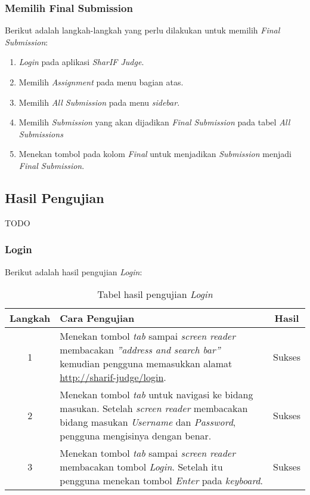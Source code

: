 \subsubsection{Memilih Final Submission}
\label{subsubsec:skenario_final_submission}
Berikut adalah langkah-langkah yang perlu dilakukan untuk memilih \textit{Final Submission}:

\begin{enumerate}
	\item \textit{Login} pada aplikasi \textit{SharIF Judge}.
	\item Memilih \textit{Assignment} pada menu bagian atas.
	\item Memilih \textit{All Submission} pada menu \textit{sidebar}.
	\item Memilih \textit{Submission} yang akan dijadikan \textit{Final Submission} pada tabel \textit{All Submissions}
	\item Menekan tombol pada kolom \textit{Final} untuk menjadikan \textit{Submission} menjadi \textit{Final Submission}.
\end{enumerate}

\subsection{Hasil Pengujian}
\label{subsec:hasil_pengujian}
TODO

\subsubsection{Login}
\label{subsubsec:hasil_login}
Berikut adalah hasil pengujian \textit{Login}:

\begin{table}[H]
	\centering
	\caption{Tabel hasil pengujian \textit{Login}}
	\label{tab:hasil_login}
	\begin{tabular}{|c|p{12cm}|c|}
		\toprule
		Langkah & Cara Pengujian & Hasil \\
		\midrule
		1 & Menekan tombol \textit{tab} sampai \textit{screen reader} membacakan \textit{''address and search bar''} kemudian pengguna memasukkan alamat \url{http://sharif-judge/login}. & Sukses\\
		2 & Menekan tombol \textit{tab} untuk navigasi ke bidang masukan. Setelah \textit{screen reader} membacakan bidang masukan \textit{Username} dan \textit{Password}, pengguna mengisinya dengan benar. & Sukses\\
		3 & Menekan tombol \textit{tab} sampai \textit{screen reader} membacakan tombol \textit{Login}. Setelah itu pengguna menekan tombol \textit{Enter} pada \textit{keyboard}. & Sukses\\
		\bottomrule
	\end{tabular}
\end{table}

